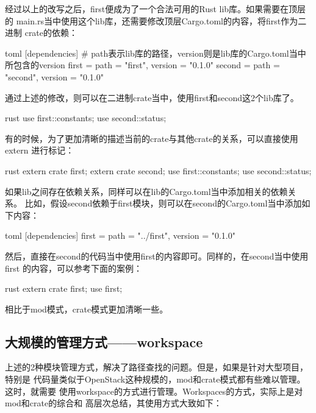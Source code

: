 经过以上的改写之后，first便成为了一个合法可用的Rust lib库。如果需要在顶层的
main.rs当中使用这个lib库，还需要修改顶层Cargo.toml的内容，将first作为二进制
crate的依赖：
\begin{code-block}{toml}
[dependencies]
# path表示lib库的路径，version则是lib库的Cargo.toml当中所包含的version
first = { path = "first", version = "0.1.0" }
second = { path = "second", version = "0.1.0" }
\end{code-block}

通过上述的修改，则可以在二进制crate当中，使用first和second这2个lib库了。
\begin{code-block}{rust}
use first::constants;
use second::status;
\end{code-block}

有的时候，为了更加清晰的描述当前的crate与其他crate的关系，可以直接使用extern
进行标记：
\begin{code-block}{rust}
extern crate first;
extern crate second;
use first::constants;
use second::status;
\end{code-block}

如果lib之间存在依赖关系，同样可以在lib的Cargo.toml当中添加相关的依赖关系。
比如，假设second依赖于first模块，则可以在second的Cargo.toml当中添加如下内容：
\begin{code-block}{toml}
[dependencies]
first = { path = "../first", version = "0.1.0" }
\end{code-block}

然后，直接在second的代码当中使用first的内容即可。同样的，在second当中使用first
的内容，可以参考下面的案例：
\begin{code-block}{rust}
extern crate first;
use first;
\end{code-block}

相比于mod模式，crate模式更加清晰一些。

\subsection{大规模的管理方式——workspace}
上述的2种模块管理方式，解决了路径查找的问题。但是，如果是针对大型项目，特别是
代码量类似于OpenStack这种规模的，mod和crate模式都有些难以管理。这时，就需要
使用workspace的方式进行管理。Workspaces的方式，实际上是对mod和crate的综合和
高层次总结，其使用方式大致如下：

